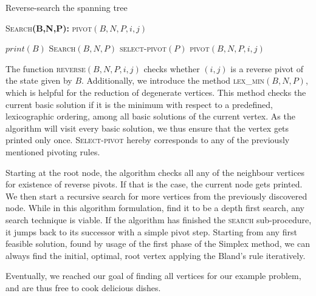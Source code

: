 \documentclass[a4paper, 11pt]{article}
\begin{document}
\begin{algorithm}[H]
	\caption{Reverse-search the spanning tree}
	\label{alg:seq}
	\begin{algorithmic}[1]
		\STATE \textsc{Search}\textbf{(B,N,P):}
		\STATE \textsc{pivot}$(B,N,P,i,j)$
		
		\STATE $print(B)$
		\ENDIF
		\STATE \textsc{Search}$(B,N,P)$
		\STATE \textsc{select-pivot}$(P)$
		\STATE \textsc{pivot}$(B,N,P,i,j)$
		
		\ENDIF
		\ENDFOR
	\end{algorithmic}
\end{algorithm}

The function \textsc{reverse}$(B,N,P,i,j)$ checks  whether $(i,j)$ is a reverse pivot of the state given by $B$. Additionally, we introduce the method \textsc{lex\_min}$(B,N,P)$, which is helpful for the reduction of degenerate vertices. This method checks the current basic solution if it is the minimum with respect to a predefined, lexicographic ordering, among all basic solutions of the current vertex. As the algorithm will visit every basic solution, we thus ensure that the vertex gets printed only once. \textsc{Select-pivot} hereby corresponds to any of the previously mentioned pivoting rules.\medskip 

Starting at the root node, the algorithm checks all any of the neighbour vertices for existence of reverse pivots. If that is the case, the current node gets printed. We then start a recursive search for more vertices from the previously discovered node. While in this algorithm formulation, find it to be a depth first search, any search technique is viable. If the algorithm has finished the \textsc{search} sub-procedure, it jumps back to its successor with a simple pivot step. Starting from any first feasible solution, found by usage of the first phase of the Simplex method, we can always find the initial, optimal, root vertex applying the Bland's rule iteratively.\medskip

Eventually, we reached our goal of finding all vertices for our example problem, and are thus free to cook delicious dishes. 
\end{document}
